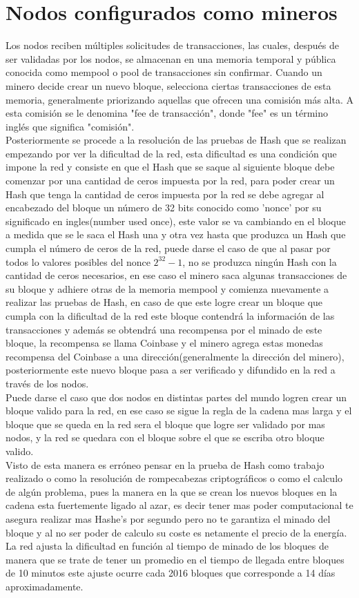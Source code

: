 \documentclass{rbf}
\begin{document}
\section{Nodos configurados como mineros}
Los nodos reciben múltiples solicitudes de transacciones, las cuales, después de ser validadas por los nodos, se almacenan en una memoria temporal y pública conocida como mempool o pool de transacciones sin confirmar. Cuando un minero decide crear un nuevo bloque, selecciona ciertas transacciones de esta memoria, generalmente priorizando aquellas que ofrecen una comisión más alta. A esta comisión se le denomina "fee de transacción", donde "fee" es un término inglés que significa "comisión".
\\
Posteriormente se procede a la  resolución de las pruebas de Hash que se realizan empezando por ver la dificultad de la red, esta dificultad es una condición que impone la red y consiste en que el Hash que se saque al siguiente bloque debe comenzar por una cantidad de ceros impuesta por la red, para poder crear un Hash que tenga la cantidad de ceros impuesta por la red se debe agregar al encabezado del bloque un número de 32 bits conocido como 'nonce' por su significado en ingles(number used once), este valor se va cambiando en el bloque a medida que se le saca el Hash una y otra vez  hasta que produzca un Hash que cumpla el número de ceros de la red, puede darse el caso de que al pasar por todos lo valores posibles del nonce $2^{32}-1$, no se produzca ningún Hash con la cantidad de ceros necesarios, en ese caso el minero saca algunas transacciones de su bloque y adhiere otras de la memoria mempool y comienza nuevamente a realizar las pruebas de Hash, en caso de que este logre crear un bloque que cumpla con la dificultad de la red este bloque contendrá la información de las transacciones y además se obtendrá una recompensa por el minado de este bloque, la recompensa se llama Coinbase y el minero agrega estas monedas recompensa del Coinbase a una dirección(generalmente la dirección del minero), posteriormente este nuevo bloque pasa a ser verificado y difundido en la red a través de los nodos.
\\
Puede darse el caso que dos nodos en distintas partes del mundo logren crear un bloque valido para la red, en ese caso se sigue la regla de la cadena mas larga y el bloque que se queda en la red sera el bloque que logre ser validado por mas nodos, y la red se quedara con el bloque sobre el que se escriba otro bloque valido.
\\
Visto de esta manera es erróneo pensar en la prueba de Hash como trabajo realizado o como la resolución de rompecabezas criptográficos o como el calculo de algún problema, pues la manera en la que se crean los nuevos bloques en la cadena esta fuertemente ligado al azar, es decir tener mas poder computacional te asegura realizar mas Hashe's por segundo pero no te garantiza el minado del bloque y al no ser poder de calculo su coste es netamente el precio de la energía.
\\
La red ajusta la dificultad en función al tiempo de minado de los bloques de manera que se trate de tener un promedio en el tiempo de llegada entre bloques de 10 minutos este ajuste ocurre cada 2016 bloques que corresponde a 14 días aproximadamente.
\end{document}

